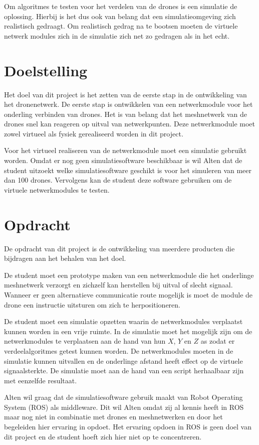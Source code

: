 \documentclass[a4paper, 11pt, oneside]{report}
\begin{document}
Om algoritmes te testen voor het verdelen van de drones is een simulatie de oplossing.
Hierbij is het dus ook van belang dat een simulatieomgeving zich realistisch gedraagt. 
Om realistisch gedrag na te bootsen moeten de virtuele netwerk modules zich in de simulatie zich net zo gedragen als in het echt.

\section{Doelstelling}
Het doel van dit project is het zetten van de eerste stap in de ontwikkeling van het dronenetwerk.
De eerste stap is ontwikkelen van een netwerkmodule voor het onderling verbinden van drones.
Het is van belang dat het meshnetwerk van de drones snel kan reageren op uitval van netwerkpunten.
Deze netwerkmodule moet zowel virtueel als fysiek gerealiseerd worden in dit project.

Voor het virtueel realiseren van de netwerkmodule moet een simulatie gebruikt worden. 
Omdat er nog geen simulatiesoftware beschikbaar is wil Alten dat de student uitzoekt welke simulatiesoftware geschikt is voor het simuleren van meer dan 100 drones.
Vervolgens kan de student deze software gebruiken om de virtuele netwerkmodules te testen.

\section{Opdracht}
De opdracht van dit project is de ontwikkeling van meerdere producten die bijdragen aan het behalen van het doel. 

De student moet een prototype maken van een netwerkmodule die het onderlinge meshnetwerk verzorgt en zichzelf kan herstellen bij uitval of slecht signaal.
Wanneer er geen alternatieve communicatie route mogelijk is moet de module de drone een instructie uitsturen om zich te herpositioneren.

De student moet een simulatie opzetten waarin de netwerkmodules verplaatst kunnen worden in een vrije ruimte. 
In de simulatie moet het mogelijk zijn om de netwerkmodules te verplaatsen aan de hand van hun $X$, $Y$ en $Z$ as zodat er verdeelalgoritmes getest kunnen worden.  
De netwerkmodules moeten in de simulatie kunnen uitvallen en de onderlinge afstand heeft effect op de virtuele signaalsterkte.
De simulatie moet aan de hand van een script herhaalbaar zijn met eenzelfde resultaat.

Alten wil graag dat de simulatiesoftware gebruik maakt van Robot Operating System (ROS) als middleware. 
Dit wil Alten omdat zij al kennis heeft in ROS maar nog niet in combinatie met drones en meshnetwerken en door het begeleiden hier ervaring in opdoet.
Het ervaring opdoen in ROS is geen doel van dit project en de student hoeft zich hier niet op te concentreren.
\end{document}
